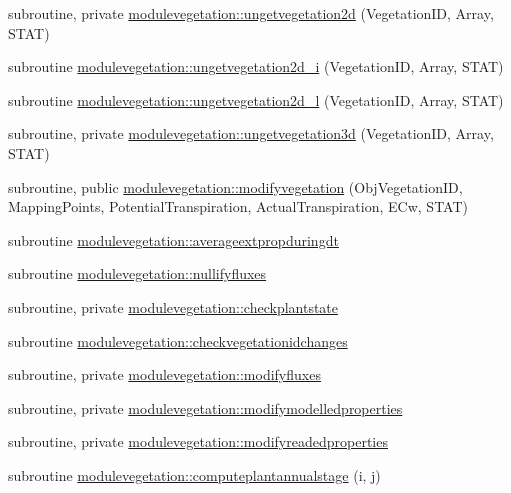 \begin{DoxyCompactItemize}
\item 
subroutine, private \mbox{\hyperlink{namespacemodulevegetation_a2ffe279db4531dedb2c50c6349246a00}{modulevegetation\+::ungetvegetation2d}} (Vegetation\+ID, Array, S\+T\+AT)
\item 
subroutine \mbox{\hyperlink{namespacemodulevegetation_a51242f691596a8990eaffb93f189b5ab}{modulevegetation\+::ungetvegetation2d\+\_\+i}} (Vegetation\+ID, Array, S\+T\+AT)
\item 
subroutine \mbox{\hyperlink{namespacemodulevegetation_ae3b94dadad52bcad92f73e4358946cda}{modulevegetation\+::ungetvegetation2d\+\_\+l}} (Vegetation\+ID, Array, S\+T\+AT)
\item 
subroutine, private \mbox{\hyperlink{namespacemodulevegetation_a1908216b2236c50cd95129a3757c0ebd}{modulevegetation\+::ungetvegetation3d}} (Vegetation\+ID, Array, S\+T\+AT)
\item 
subroutine, public \mbox{\hyperlink{namespacemodulevegetation_ada29538c07fc35e07aff7961509fee8d}{modulevegetation\+::modifyvegetation}} (Obj\+Vegetation\+ID, Mapping\+Points, Potential\+Transpiration, Actual\+Transpiration, E\+Cw, S\+T\+AT)
\item 
subroutine \mbox{\hyperlink{namespacemodulevegetation_a7f06e4e44dcbf158ef41eaf0b26ef491}{modulevegetation\+::averageextpropduringdt}}
\item 
subroutine \mbox{\hyperlink{namespacemodulevegetation_a902f9aa035167e92ff669898d4bb5c14}{modulevegetation\+::nullifyfluxes}}
\item 
subroutine, private \mbox{\hyperlink{namespacemodulevegetation_a37069c3859e6dc1812ad2ddda5ab49cd}{modulevegetation\+::checkplantstate}}
\item 
subroutine \mbox{\hyperlink{namespacemodulevegetation_af6b014e82fcb0998befe6b8a12f66de3}{modulevegetation\+::checkvegetationidchanges}}
\item 
subroutine, private \mbox{\hyperlink{namespacemodulevegetation_aa3811c1a240a54342243a4e460197d77}{modulevegetation\+::modifyfluxes}}
\item 
subroutine, private \mbox{\hyperlink{namespacemodulevegetation_a5532e866feccedcf7ef4094cb3f08064}{modulevegetation\+::modifymodelledproperties}}
\item 
subroutine, private \mbox{\hyperlink{namespacemodulevegetation_a510092ab1c09ecfe1b683080ec88826a}{modulevegetation\+::modifyreadedproperties}}
\item 
subroutine \mbox{\hyperlink{namespacemodulevegetation_aeb0bf58b2fe65989291c935b652a185e}{modulevegetation\+::computeplantannualstage}} (i, j)

\end{DoxyCompactItemize}
